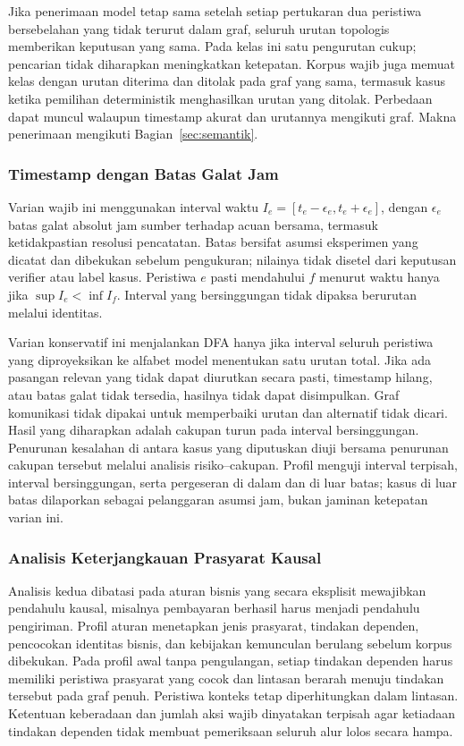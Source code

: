 Jika penerimaan model tetap sama setelah setiap pertukaran dua peristiwa bersebelahan yang tidak terurut dalam graf, seluruh urutan topologis memberikan keputusan yang sama. Pada kelas ini satu pengurutan cukup; pencarian tidak diharapkan meningkatkan ketepatan. Korpus wajib juga memuat kelas dengan urutan diterima dan ditolak pada graf yang sama, termasuk kasus ketika pemilihan deterministik menghasilkan urutan yang ditolak. Perbedaan dapat muncul walaupun timestamp akurat dan urutannya mengikuti graf. Makna penerimaan mengikuti Bagian~\ref{sec:semantik}.

\subsubsection{Timestamp dengan Batas Galat Jam}
Varian wajib ini menggunakan interval waktu $I_e=[t_e-\epsilon_e,t_e+\epsilon_e]$, dengan $\epsilon_e$ batas galat absolut jam sumber terhadap acuan bersama, termasuk ketidakpastian resolusi pencatatan. Batas bersifat asumsi eksperimen yang dicatat dan dibekukan sebelum pengukuran; nilainya tidak disetel dari keputusan verifier atau label kasus. Peristiwa $e$ pasti mendahului $f$ menurut waktu hanya jika $\sup I_e<\inf I_f$. Interval yang bersinggungan tidak dipaksa berurutan melalui identitas.

Varian konservatif ini menjalankan DFA hanya jika interval seluruh peristiwa yang diproyeksikan ke alfabet model menentukan satu urutan total. Jika ada pasangan relevan yang tidak dapat diurutkan secara pasti, timestamp hilang, atau batas galat tidak tersedia, hasilnya tidak dapat disimpulkan. Graf komunikasi tidak dipakai untuk memperbaiki urutan dan alternatif tidak dicari. Hasil yang diharapkan adalah cakupan turun pada interval bersinggungan. Penurunan kesalahan di antara kasus yang diputuskan diuji bersama penurunan cakupan tersebut melalui analisis risiko--cakupan. Profil menguji interval terpisah, interval bersinggungan, serta pergeseran di dalam dan di luar batas; kasus di luar batas dilaporkan sebagai pelanggaran asumsi jam, bukan jaminan ketepatan varian ini.

\subsubsection{Analisis Keterjangkauan Prasyarat Kausal}
\label{sec:prerequisite-analysis}
Analisis kedua dibatasi pada aturan bisnis yang secara eksplisit mewajibkan pendahulu kausal, misalnya pembayaran berhasil harus menjadi pendahulu pengiriman. Profil aturan menetapkan jenis prasyarat, tindakan dependen, pencocokan identitas bisnis, dan kebijakan kemunculan berulang sebelum korpus dibekukan. Pada profil awal tanpa pengulangan, setiap tindakan dependen harus memiliki peristiwa prasyarat yang cocok dan lintasan berarah menuju tindakan tersebut pada graf penuh. Peristiwa konteks tetap diperhitungkan dalam lintasan. Ketentuan keberadaan dan jumlah aksi wajib dinyatakan terpisah agar ketiadaan tindakan dependen tidak membuat pemeriksaan seluruh alur lolos secara hampa.


